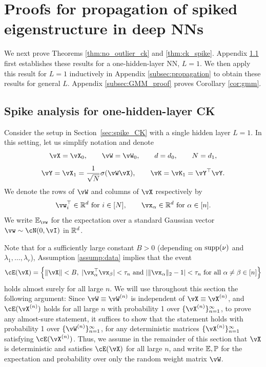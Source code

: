\section{Proofs for propagation of spiked eigenstructure in deep NNs}\label{sec:CK_spike_proof}

We next prove Theorems \ref{thm:no_outlier_ck} and \ref{thm:ck_spike}.
Appendix \ref{subsec:onelayer} first
establishes these results for a one-hidden-layer NN, $L=1$. We then apply this
result for $L=1$ inductively in Appendix \ref{subsec:propagation} to obtain
these results for general $L$. Appendix \ref{subsec:GMM_proof} proves
Corollary \ref{cor:gmm}.

\subsection{Spike analysis for one-hidden-layer CK}\label{subsec:onelayer}

Consider the setup in Section~\ref{sec:spike_CK} with a single hidden
layer $L=1$. In this setting, let us simplify notation and denote
\[\vX=\vX_0, \qquad \vW=\vW_0, \qquad d=d_0, \qquad N=d_1,\]
\[\vY=\vX_1=\frac{1}{\sqrt{N}}\sigma (\vW\vX),
\qquad \vK=\vK_1=\vY^\top \vY.\]
We denote the rows of $\vW$ and columns of $\vX$ respectively by
\[\vw_i^\top \in \R^d \text{ for } i \in [N],
\qquad \vx_\alpha \in \R^d \text{ for } \alpha \in [n].\]
We write $\E_{\vw}$ for
the expectation over a standard Gaussian vector $\vw \sim \cN(0,\vI)$ in $\mathbb{R}^d$.

Note that for a sufficiently large constant $B>0$
(depending on $\mathrm{supp}({\nu})$ and $\lambda_1,\ldots,\lambda_r$),
Assumption \ref{assump:data} implies that the event
\begin{equation}\label{eq:goodevent}
\cE(\vX)=\Big\{\|\vX\|<B,\; |\vx_\alpha^\top \vx_\beta|<\tau_n
\text{ and } |\|\vx_\alpha\|_2-1|<\tau_n
\text{ for all } \alpha \neq \beta \in [n]\Big\}
\end{equation}
holds almost surely for all large $n$. We will use throughout this
section the following argument: Since $\vW \equiv \vW^{(n)}$ is independent
of $\vX \equiv \vX^{(n)}$, and $\cE(\vX^{(n)})$ holds for all large $n$ with
probability 1 over $\{\vX^{(n)}\}_{n=1}^\infty$, to prove any almost-sure
statement, it suffices to show that the statement holds with
probability 1 over $\{\vW^{(n)}\}_{n=1}^\infty$, for any deterministic
matrices $\{\vX^{(n)}\}_{n=1}^\infty$ satisfying $\cE(\vX^{(n)})$.
Thus, we assume in the remainder of this section that
$\vX$ is deterministic and satisfies $\cE(\vX)$
for all large $n$, and write $\mathbb{E},\mathbb{P}$ for the
expectation and probability over only the random weight matrix $\vW$.


